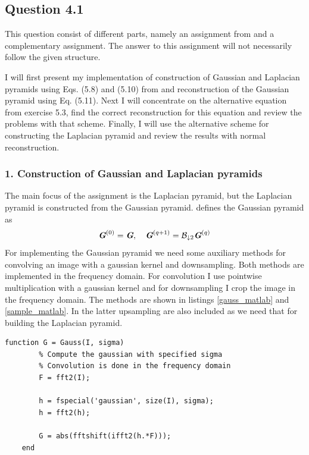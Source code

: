 \documentclass[a4paper, 10pt, final]{article}
\title{\mytitle}
\subtitle{\mysubtitle}
\author{\myauthor{} - \mymail}
\date{\mydate}
\begin{document}
\maketitle

\subsection*{Question 4.1}
This question consist of different parts, namely an assignment from
\citep{jahne-digital} and a complementary assignment. The answer to this
assignment will not necessarily follow the given structure.

I will first present my implementation of construction of Gaussian and
Laplacian pyramids using Eqs. (5.8) and (5.10) from
\citep{jahne-digital} and reconstruction of the Gaussian pyramid using
Eq. (5.11). Next I will concentrate on the alternative equation from
\citep{jahne-digital} exercise 5.3, find the correct reconstruction for
this equation and review the problems with that scheme. Finally, I will
use the alternative scheme for constructing the Laplacian pyramid and
review the results with normal reconstruction.

\subsubsection*{1. Construction of Gaussian and Laplacian pyramids}
The main focus of the assignment is the Laplacian pyramid, but the
Laplacian pyramid is constructed from the Gaussian pyramid.
\citep[Eq. (5.8)]{jahne-digital} defines the Gaussian pyramid as
\begin{equation}
    \textbf{\em G}^{(0)} = \textbf{\em G}, ~~~\textbf{\em G}^{(q + 1)} =
    \mathcal{B}_{\downarrow 2}\textbf{\em G}^{(q)}
    \label{gauss_pyr_def}
\end{equation}
For implementing the Gaussian pyramid we need some auxiliary methods for
convolving an image with a gaussian kernel and downsampling. Both
methods are implemented in the frequency domain. For convolution I
use pointwise multiplication with a gaussian kernel and for downsampling
I crop the image in the frequency domain. The methods are shown in
listings \ref{gauss_matlab} and \ref{sample_matlab}. In the latter
upsampling are also included as we need that for building the Laplacian
pyramid.

\begin{lstlisting}[caption={Convolution with a gaussian kernel in the
    frequency domain.}, captionpos=b,
    label={gauss_matlab}, float=b, numbers=none]
    function G = Gauss(I, sigma)
        % Compute the gaussian with specified sigma
        % Convolution is done in the frequency domain
        F = fft2(I);
        
        h = fspecial('gaussian', size(I), sigma);
        h = fft2(h);
                
        G = abs(fftshift(ifft2(h.*F)));
    end
\end{lstlisting}
\end{document}
